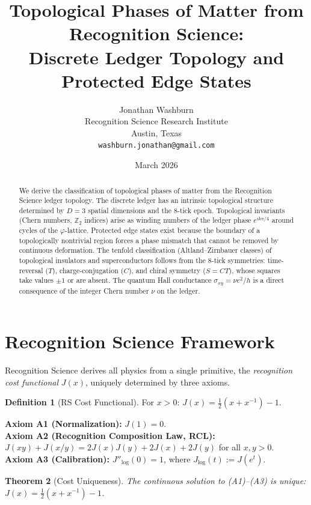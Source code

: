\documentclass[12pt,a4paper]{article}
\title{Topological Phases of Matter from Recognition Science:\\
Discrete Ledger Topology and Protected Edge States}
\author{Jonathan Washburn\\
Recognition Science Research Institute\\
Austin, Texas\\
\texttt{washburn.jonathan@gmail.com}}
\date{March 2026}
\newtheorem{theorem}{Theorem}[section]
\theoremstyle{definition}
\newtheorem{definition}[theorem]{Definition}
\theoremstyle{remark}
\begin{document}
\maketitle

\begin{abstract}
We derive the classification of topological phases of matter from
the Recognition Science ledger topology.  The discrete ledger has
an intrinsic topological structure determined by $D = 3$ spatial
dimensions and the 8-tick epoch.  Topological invariants (Chern
numbers, $\mathbb{Z}_2$ indices) arise as winding numbers of the
ledger phase $e^{ik\pi/4}$ around cycles of the $\varphi$-lattice.
Protected edge states exist because the boundary of a topologically
nontrivial region forces a phase mismatch that cannot be removed by
continuous deformation.  The tenfold classification (Altland--Zirnbauer
classes) of topological insulators and superconductors follows from
the 8-tick symmetries: time-reversal ($T$), charge-conjugation ($C$),
and chiral symmetry ($S = CT$), whose squares take values
$\pm 1$ or are absent.  The quantum Hall conductance
$\sigma_{xy} = \nu e^2/h$ is a direct consequence of the integer
Chern number $\nu$ on the ledger.
\end{abstract}

\section{Recognition Science Framework}
\label{sec:framework}

Recognition Science derives all physics from a single primitive,
the \emph{recognition cost functional} $J(x)$, uniquely determined
by three axioms.

\begin{definition}[RS Cost Functional]
For $x > 0$: $J(x) = \tfrac{1}{2}(x + x^{-1}) - 1$.
\end{definition}

\noindent\textbf{Axiom A1 (Normalization):} $J(1) = 0$.\\
\textbf{Axiom A2 (Recognition Composition Law, RCL):}
$J(xy) + J(x/y) = 2J(x)J(y) + 2J(x) + 2J(y)$ for all $x, y > 0$.\\
\textbf{Axiom A3 (Calibration):} $J''_{\log}(0) = 1$, where
$J_{\log}(t) := J(e^t)$.

\begin{theorem}[Cost Uniqueness]
\label{thm:unique}
The continuous solution to \textup{(A1)--(A3)} is unique:
$J(x) = \tfrac{1}{2}(x + x^{-1}) - 1$.
\end{theorem}
\end{document}
